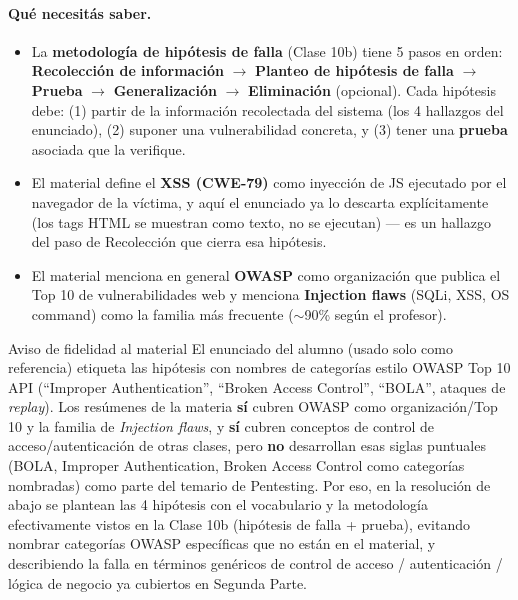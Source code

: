 \paragraph{Qué necesitás saber.}
\begin{itemize}
  \item La \textbf{metodología de hipótesis de falla} (Clase 10b) tiene 5 pasos en orden:
  \textbf{Recolección de información} $\to$ \textbf{Planteo de hipótesis de falla} $\to$
  \textbf{Prueba} $\to$ \textbf{Generalización} $\to$ \textbf{Eliminación} (opcional). Cada
  hipótesis debe: (1) partir de la información recolectada del sistema (los 4 hallazgos del
  enunciado), (2) suponer una vulnerabilidad concreta, y (3) tener una \textbf{prueba}
  asociada que la verifique.
  \item El material define el \textbf{XSS (CWE-79)} como inyección de JS ejecutado por el
  navegador de la víctima, y aquí el enunciado ya lo descarta explícitamente (los tags HTML
  se muestran como texto, no se ejecutan) --- es un hallazgo del paso de Recolección que cierra
  esa hipótesis.
  \item El material menciona en general \textbf{OWASP} como organización que publica el
  Top 10 de vulnerabilidades web y menciona \textbf{Injection flaws} (SQLi, XSS, OS command)
  como la familia más frecuente ($\sim$90\% según el profesor).
\end{itemize}

\begin{warnbox}{Aviso de fidelidad al material}
El enunciado del alumno (usado solo como referencia) etiqueta las hipótesis con nombres de
categorías estilo OWASP Top 10 API (``Improper Authentication'', ``Broken Access Control'',
``BOLA'', ataques de \emph{replay}). Los resúmenes de la materia \textbf{sí} cubren OWASP
como organización/Top 10 y la familia de \emph{Injection flaws}, y \textbf{sí} cubren
conceptos de control de acceso/autenticación de otras clases, pero \textbf{no} desarrollan
esas siglas puntuales (BOLA, Improper Authentication, Broken Access Control como categorías
nombradas) como parte del temario de Pentesting. Por eso, en la resolución de abajo se
plantean las 4 hipótesis con el vocabulario y la metodología efectivamente vistos en la
Clase 10b (hipótesis de falla + prueba), evitando nombrar categorías OWASP específicas que no
están en el material, y describiendo la falla en términos genéricos de control de acceso /
autenticación / lógica de negocio ya cubiertos en Segunda Parte.
\end{warnbox}

